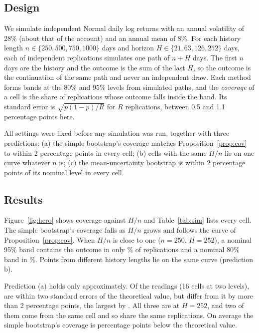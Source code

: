 \documentclass{article}
\begin{document}
\subsection{Design}
We simulate independent Normal daily log returns with an annual volatility of 28\% (about that of
the
account) and an annual mean of 8\%. For each history length $n\in\{250,500,750,1000\}$ days and
horizon
$H\in\{21,63,126,252\}$ days, each of \simReps{} independent replications simulates one path of
$n+H$ days.
The first $n$ days are the history and the outcome is the sum of the last $H$, so the outcome is the
continuation of the same path and never an independent draw. Each method forms bands at the 80\% and
95\%
levels from \simPaths{} simulated paths, and the \emph{coverage} of a cell is the share of
replications whose
outcome falls inside the band. Its standard error is $\sqrt{p(1-p)/R}$ for $R$ replications, between
0.5 and
1.1 percentage points here.

All settings were fixed before any simulation was run, together with three predictions: (a) the
simple
bootstrap's coverage matches Proposition~\ref{prop:cov} to within 2 percentage points in every cell;
(b) cells
with the same $H/n$ lie on one curve whatever $n$ is; (c) the mean-uncertainty bootstrap is within 2
percentage points of its nominal level in every cell.

\subsection{Results}
Figure~\ref{fig:hero} shows coverage against $H/n$ and Table~\ref{tab:sim} lists every cell. The
simple
bootstrap's coverage falls as $H/n$ grows and follows the curve of Proposition~\ref{prop:cov}. When
$H/n$ is
close to one ($n=250$, $H=252$), a nominal 95\% band contains the outcome in only
\simCovHnnNinetyFive\% of
replications and a nominal 80\% band in \simCovHnnEighty\%. Points from different history lengths
lie on the
same curve (prediction b).

Prediction (a) holds only approximately. Of the \simCells{} readings (16 cells at two levels),
\simWithinTwoSeSimple{} are within two standard errors of the theoretical value, but
\simOverTwoPoints{} differ
from it by more than 2 percentage points, the largest by \simMaxGapSimple{}. All three are at
$H=252$, and two
of them come from the same cell and so share the same replications. On average the simple
bootstrap's
coverage is \simMeanGapSimple{} percentage points below the theoretical value.
\end{document}
